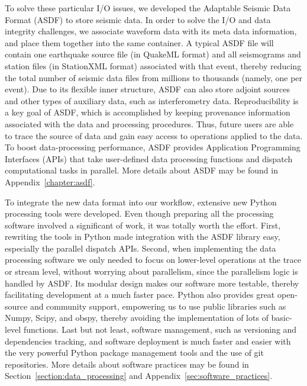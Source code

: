 To solve these particular I/O issues, we developed the Adaptable
Seismic Data Format (ASDF) to store seismic data. 
In order to solve the I/O and data integrity challenges, we associate
waveform data with its meta data information, and place them together into the same container.
A typical ASDF file will contain one
earthquake source file (in QuakeML format) and all seismograms and station files (in StationXML format) associated with that event,
thereby reducing the total number of seismic data files from millions to thousands (namely, one per event).
Due to its flexible inner structure,
ASDF can also store adjoint sources and other types of auxiliary data,
such as interferometry data.
Reproducibility is a key goal of ASDF,
which is accomplished by keeping provenance information
associated with the data and processing procedures.
Thus, future users are able to trace the source of data and gain easy access
to operations applied to the data.
To boost data-processing performance, ASDF provides Application Programming Interfaces (APIs) that take
user-defined data processing functions and dispatch computational tasks in parallel.
More details about ASDF may be found in Appendix~\ref{chapter:asdf}.

To integrate the new data format into our workflow,
extensive new Python processing tools were developed.
Even though preparing all the processing software involved a significant of work,
it was totally worth the effort.
First, rewriting the tools in Python made integration with the ASDF library easy,
especially the parallel dispatch APIs.
Second,
when implementing the data processing software we only needed to focus on lower-level
operations at the trace or stream level, without worrying about parallelism,
since the parallelism logic is handled by ASDF.
Its modular design makes our software more testable, thereby facilitating development at a much faster pace.
Python also provides great open-source and community support,
empowering us to use public libraries such as Numpy, Scipy, and obspy,
thereby avoiding the implementation of lots of basic-level functions.
Last but not least, software management, such as versioning and dependencies tracking,
and software deployment is much faster and easier with the very powerful Python package management tools and
the use of git repositories.
More details about software practices may be found in 
Section~\ref{section:data_processing} and Appendix~\ref{sec:software_practices}.

